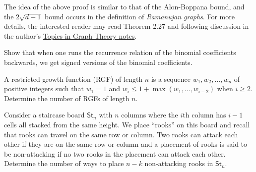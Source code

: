 		The idea of the above proof is similar to that of the Alon-Boppana bound, and the $2\sqrt{d-1}$ bound occurs in the definition of \emph{Ramanujan graphs}. For more details, the interested reader may read Theorem 2.27 and following discussion in the author's \href{https://amitrajaraman.github.io/notes/ma-5109/main.pdf}{Topics in Graph Theory notes}.

		\begin{problem}
			Show that when one runs the recurrence relation of the binomial coefficients backwards, we get signed versions of the binomial coefficients.
		\end{problem}

		\begin{problem}
			A restricted growth function (RGF) of length $n$ is a sequence $w_1,w_2,\ldots,w_n$ of positive integers such that $w_1 = 1$ and $w_i \le 1 + \max(w_1,\ldots,w_{i-2})$ when $i \ge 2$. Determine the number of RGFs of length $n$.
		\end{problem}

		\begin{problem}
			Consider a staircase board $\mathsf{St}_n$ with $n$ columns where the $i$th column has $i-1$ cells all stacked from the same height. We place ``rooks'' on this board and recall that rooks can travel on the same row or column. Two rooks can attack each other if they are on the same row or column and a placement of rooks is said to be non-attacking if no two rooks in the placement can attack each other. Determine the number of ways to place $n-k$ non-attacking rooks in $\mathsf{St}_n$.
		\end{problem}

